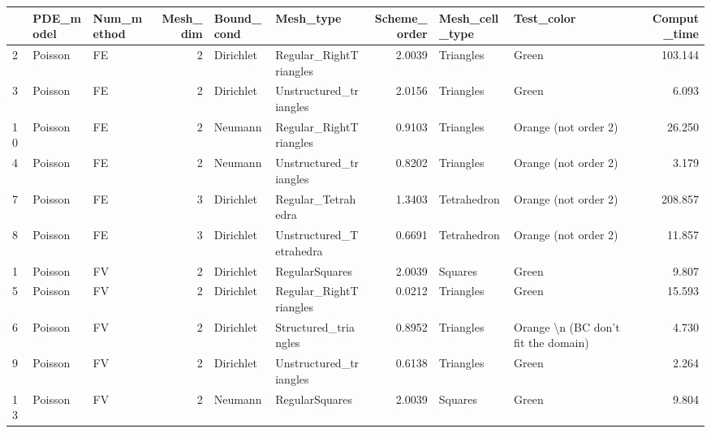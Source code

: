 \begin{tabular}{lllrllrllr}
\toprule
{} & PDE\_model & Num\_method &  Mesh\_dim & Bound\_cond &                Mesh\_type &  Scheme\_order & Mesh\_cell\_type &                                  Test\_color &  Comput\_time \\
\midrule
2  &   Poisson &         FE &         2 &  Dirichlet &   Regular\_RightTriangles &        2.0039 &      Triangles &                                       Green &      103.144 \\
3  &   Poisson &         FE &         2 &  Dirichlet &   Unstructured\_triangles &        2.0156 &      Triangles &                                       Green &        6.093 \\
10 &   Poisson &         FE &         2 &    Neumann &   Regular\_RightTriangles &        0.9103 &      Triangles &                        Orange (not order 2) &       26.250 \\
4  &   Poisson &         FE &         2 &    Neumann &   Unstructured\_triangles &        0.8202 &      Triangles &                        Orange (not order 2) &        3.179 \\
7  &   Poisson &         FE &         3 &  Dirichlet &       Regular\_Tetrahedra &        1.3403 &    Tetrahedron &                        Orange (not order 2) &      208.857 \\
8  &   Poisson &         FE &         3 &  Dirichlet &  Unstructured\_Tetrahedra &        0.6691 &    Tetrahedron &                        Orange (not order 2) &       11.857 \\
1  &   Poisson &         FV &         2 &  Dirichlet &           RegularSquares &        2.0039 &        Squares &                                       Green &        9.807 \\
5  &   Poisson &         FV &         2 &  Dirichlet &   Regular\_RightTriangles &        0.0212 &      Triangles &                                       Green &       15.593 \\
6  &   Poisson &         FV &         2 &  Dirichlet &     Structured\_triangles &        0.8952 &      Triangles &         Orange \textbackslash n (BC don't fit the domain) &        4.730 \\
9  &   Poisson &         FV &         2 &  Dirichlet &   Unstructured\_triangles &        0.6138 &      Triangles &                                       Green &        2.264 \\
13 &   Poisson &         FV &         2 &    Neumann &           RegularSquares &        2.0039 &        Squares &                                       Green &        9.804 \\

\end{tabular}
